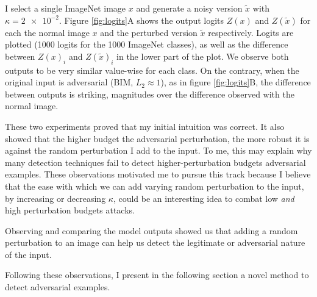 I select a single ImageNet image $x$ and generate a noisy version $\tilde{x}$
with $\kappa=\num{2e-2}$. Figure \ref{fig:logits}A shows the output logits
$Z(x)$ and $Z(\tilde{x})$ for each the normal image $x$ and the perturbed
version $\tilde{x}$ respectively. Logits are plotted (1000 logits for the 1000
ImageNet classes), as well as the difference between $Z(x)_i$ and
$Z(\tilde{x})_i$ in the lower part of the plot. We observe both outputs to be
very similar value-wise for each class. On the contrary, when the original input
is adversarial (BIM, $L_2 \approx 1$), as in figure \ref{fig:logits}B, the
difference between outputs is striking, magnitudes over the difference observed
with the normal image.

These two experiments proved that my initial intuition was correct. It also
showed that the higher budget the adversarial perturbation, the more robust it
is against the random perturbation I add to the input. To me, this may explain
why many detection techniques fail to detect higher-perturbation budgets
adversarial examples. These observations motivated me to pursue this track
because I believe that the ease with which we can add varying random
perturbation to the input, by increasing or decreasing $\kappa$, could be an
interesting idea to combat low \emph{and} high perturbation budgets attacks.

Observing and comparing the model outputs showed us that adding a random
perturbation to an image can help us detect the legitimate or adversarial nature
of the input.

Following these observations, I present in the following section a novel method
to detect adversarial examples.
